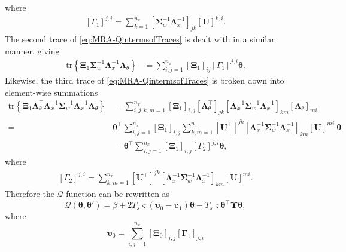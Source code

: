 \documentclass[11pt,draftcls,onecolumn,peerreview]{IEEEtran}
\begin{document}
where
\begin{align}
\left[ \Gamma_1\right]^{j,i} =\sum_{k=1}^{n_x}\left[ \boldsymbol\Sigma_w^{-1}\boldsymbol\Lambda_x^{-1}\right]_{jk} \left[ \mathbf U\right]^{k,i}.
\end{align}
The second trace of \eqref{eq:MRA-QintermsofTraces} is dealt with in a similar manner, giving
\begin{align}
\mathrm{tr} \left\lbrace \boldsymbol \Xi_1\boldsymbol\Sigma_w^{-1}\boldsymbol\Lambda_x^{-1}\boldsymbol\Lambda_{\theta}\right\rbrace&=
\sum_{i,j=1}^{n_x}\left[ \boldsymbol\Xi_1\right]_{ij}\left[ \Gamma_1\right] ^{j,i}\boldsymbol\theta.
\end{align}
Likewise, the third trace of \eqref{eq:MRA-QintermsofTraces} is broken down into element-wise summations
\begin{align}
\mathrm{tr} \left\lbrace \boldsymbol\Xi_1 \boldsymbol\Lambda_{\theta}^\top\boldsymbol\Lambda_x^{-1}\boldsymbol\Sigma_w^{-1}\boldsymbol\Lambda_x^{-1}\boldsymbol\Lambda_{\theta}\right\rbrace&=\sum_{i,j,k,m=1}^{n_x}\left[\boldsymbol\Xi_1\right] _{i,j}[\boldsymbol\Lambda_{\theta}^{\top}]_{jk} \left[\boldsymbol\Lambda_x^{-1}\boldsymbol\Sigma_w^{-1}\boldsymbol\Lambda_x^{-1} \right]_{km}[\boldsymbol\Lambda_{\theta}]_{mi} \nonumber \\
=&\boldsymbol\theta^\top\sum_{i,j=1}^{n_x}\left[\boldsymbol\Xi_1\right] _{i,j}\sum_{k,m=1}^{n_x}[\mathbf U^{\top}]^{jk} \left[\boldsymbol\Lambda_x^{-1}\boldsymbol\Sigma_w^{-1}\boldsymbol\Lambda_x^{-1} \right]_{km}[\mathbf U]^{mi}~\boldsymbol\theta \nonumber \\
&=\boldsymbol\theta^\top\sum_{i,j=1}^{n_x}\left[\boldsymbol\Xi_1\right] _{i,j}\left[ \Gamma_2\right] ^{j,i}\boldsymbol\theta,
\end{align}
where
\begin{align}
\left[ \Gamma_2\right] ^{j,i}=\sum_{k,m=1}^{n_x}[\mathbf U^{\top}]^{jk} \left[\boldsymbol\Lambda_x^{-1}\boldsymbol\Sigma_w^{-1}\boldsymbol\Lambda_x^{-1} \right]_{km}[\mathbf U]^{mi}.
\end{align}
Therefore the $\mathcal Q$-function can be rewritten as
\begin{equation}\label{eq:MRA-QCompact}
\mathcal Q\left(\boldsymbol \theta,\boldsymbol\theta'\right)=\beta+2T_s\varsigma\left(\boldsymbol\upsilon_0-\boldsymbol\upsilon_1\right)\boldsymbol\theta-T_s\varsigma\boldsymbol\theta^\top\boldsymbol\Upsilon\boldsymbol\theta,
\end{equation}
where
\begin{equation}\label{eq:epsilon0}
\boldsymbol\upsilon_0=\sum_{i,j=1}^{n_x}[\boldsymbol\Xi_0]_{i,j}[\boldsymbol\Gamma_1]_{j,i}
\end{equation}
\end{document}
